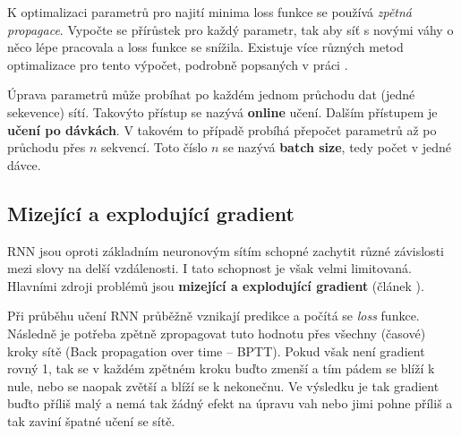 
K optimalizaci parametrů pro najití minima loss funkce se používá \emph{zpětná propagace}. Vypočte se přírůstek pro každý parametr, tak aby síť s novými váhy o něco lépe pracovala a loss funkce se snížila. Existuje více různých metod optimalizace pro tento výpočet, podrobně popsaných v práci \cite{gradientDescent}.

Úprava parametrů může probíhat po každém jednom průchodu dat (jedné sekevence) sítí. Takovýto přístup se nazývá \textbf{online} učení. Dalším přístupem je \textbf{učení po dávkách}. V takovém to případě probíhá přepočet parametrů až po průchodu přes $n$ sekvencí. Toto číslo $n$ se nazývá \textbf{batch size}, tedy počet  v jedné dávce.

%
%
%


\subsection{Mizející a explodující gradient} \label{subsection:gradient}
RNN jsou oproti základním neuronovým sítím schopné zachytit různé závislosti mezi slovy na delší vzdálenosti. I tato schopnost je však velmi limitovaná. Hlavními zdroji problémů jsou \textbf{mizející a explodující gradient} (článek \cite{gradientProblems}).


Při průběhu učení RNN průběžně vznikají predikce a počítá se \emph{loss} funkce. Následně je potřeba zpětně zpropagovat tuto hodnotu přes všechny (časové) kroky sítě (Back propagation over time -- BPTT). Pokud však není gradient rovný 1, tak se v každém zpětném kroku buďto zmenší a tím pádem se blíží k nule, nebo se naopak zvětší a blíží se k nekonečnu. Ve výsledku je tak gradient buďto příliš malý a nemá tak žádný efekt na úpravu vah nebo jimi pohne příliš a tak zaviní špatné učení se sítě.

